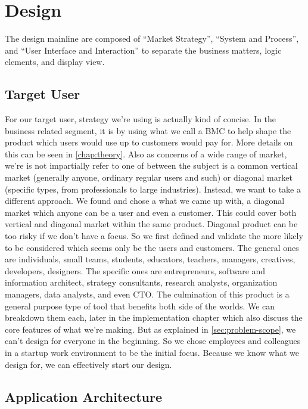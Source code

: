 \section{Design}
\label{sec:design}

The design mainline are composed of ``Market Strategy'', ``System and Process'', and ``User Interface and Interaction'' to separate the business matters, logic elements, and display view.

\subsection{Target User}

For our target user, strategy we're using is actually kind of concise. In the business related segment, it is by using what we call a \ac{BMC} to help shape the product which users would use up to customers would pay for. More details on this can be seen in \autoref{chap:theory}.
Also as concerns of a wide range of market, we're is not impartially refer to one of between the subject is a common vertical market (generally anyone, ordinary regular users and such) or diagonal market (specific types, from professionals to large industries).
Instead, we want to take a different approach.
We found and chose a what we came up with, a diagonal market which anyone can be a user and even a customer.
This could cover both vertical and diagonal market within the same product.
Diagonal product can be too risky if we don't have a focus.
So we first defined and validate the more likely to be considered which seems only be the users and customers.
The general ones are individuals, small teams, students, educators, teachers, managers, creatives, developers, designers. The specific ones are entrepreneurs, software and information architect, strategy consultants, research analysts, organization managers, data analysts, and even \ac{CTO}.
The culmination of this product is a general purpose type of tool that benefits both side of the worlds.
We can breakdown them each, later in the implementation chapter which also discuss the core features of what we're making.
But as explained in \autoref{sec:problem-scope}, we can't design for everyone in the beginning.
So we chose employees and colleagues in a startup work environment to be the initial focus.
Because we know what we design for, we can effectively start our design.

\subsection{Application Architecture}

